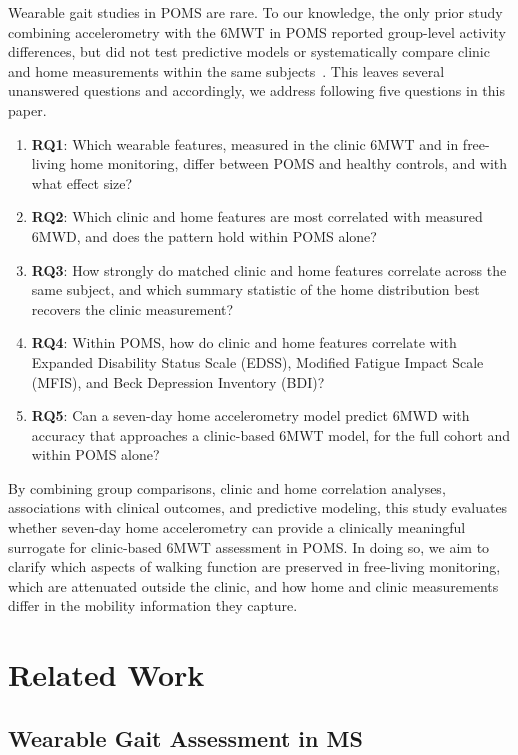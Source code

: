 \documentclass{article}
\begin{document}
Wearable gait studies in POMS are rare. To our knowledge, the only prior study combining accelerometry with the 6MWT in POMS reported group-level activity differences, but did not test predictive models or systematically compare clinic and home measurements within the same subjects~\cite{brenton2022sixminute}. This leaves several unanswered questions and accordingly, we address following five questions in this paper.

\begin{enumerate}
    \item \textbf{RQ1}: Which wearable features, measured in the clinic 6MWT and in free-living home monitoring, differ between POMS and healthy controls, and with what effect size?
    \item \textbf{RQ2}: Which clinic and home features are most correlated with measured 6MWD, and does the pattern hold within POMS alone?
    \item \textbf{RQ3}: How strongly do matched clinic and home features correlate across the same subject, and which summary statistic of the home distribution best recovers the clinic measurement?
    \item \textbf{RQ4}: Within POMS, how do clinic and home features correlate with Expanded Disability Status Scale (EDSS), Modified Fatigue Impact Scale (MFIS), and Beck Depression Inventory (BDI)?
    \item \textbf{RQ5}: Can a seven-day home accelerometry model predict 6MWD with accuracy that approaches a clinic-based 6MWT model, for the full cohort and within POMS alone?
\end{enumerate}

By combining group comparisons, clinic and home correlation analyses, associations with clinical outcomes, and predictive modeling, this study evaluates whether seven-day home accelerometry can provide a clinically meaningful surrogate for clinic-based 6MWT assessment in POMS. In doing so, we aim to clarify which aspects of walking function are preserved in free-living monitoring, which are attenuated outside the clinic, and how home and clinic measurements differ in the mobility information they capture.


\section{Related Work}\label{sec:related}

\subsection{Wearable Gait Assessment in MS}
\end{document}
